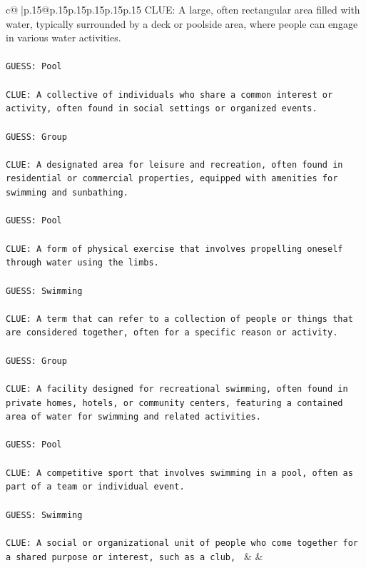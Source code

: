 \documentclass{article}
\begin{document}
{\begin{supertabular}{c@{$\;$}|p{.15\linewidth}@{}p{.15\linewidth}p{.15\linewidth}p{.15\linewidth}p{.15\linewidth}p{.15\linewidth}}
{{{	 CLUE: A large, often rectangular area filled with water, typically surrounded by a deck or poolside area, where people can engage in various water activities.\\ \tt \\ \tt GUESS: Pool\\ \tt \\ \tt CLUE: A collective of individuals who share a common interest or activity, often found in social settings or organized events.\\ \tt \\ \tt GUESS: Group\\ \tt \\ \tt CLUE: A designated area for leisure and recreation, often found in residential or commercial properties, equipped with amenities for swimming and sunbathing.\\ \tt \\ \tt GUESS: Pool\\ \tt \\ \tt CLUE: A form of physical exercise that involves propelling oneself through water using the limbs.\\ \tt \\ \tt GUESS: Swimming\\ \tt \\ \tt CLUE: A term that can refer to a collection of people or things that are considered together, often for a specific reason or activity.\\ \tt \\ \tt GUESS: Group\\ \tt \\ \tt CLUE: A facility designed for recreational swimming, often found in private homes, hotels, or community centers, featuring a contained area of water for swimming and related activities.\\ \tt \\ \tt GUESS: Pool\\ \tt \\ \tt CLUE: A competitive sport that involves swimming in a pool, often as part of a team or individual event.\\ \tt \\ \tt GUESS: Swimming\\ \tt \\ \tt CLUE: A social or organizational unit of people who come together for a shared purpose or interest, such as a club, 
	  } 
	   } 
	   } 
	 & & \\ 
 

    \theutterance {}  


\end{supertabular}}
\end{document}
